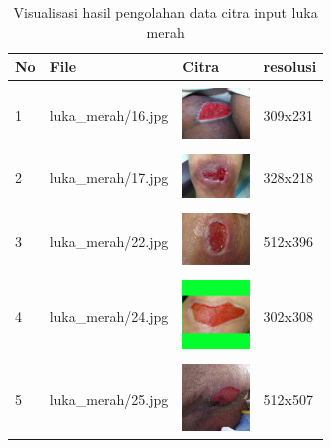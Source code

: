 \begin{table}[H]
	\centering
	\caption{Visualisasi hasil pengolahan data citra input luka merah}
	\label{tabel_input_8}
	\begin{tabular}{|m{0.2in}|m{1.2in}|m{0.7in}|m{0.7in}|}
		\hline
		\textbf{No} & \textbf{File} & \textbf{Citra} & \textbf{resolusi} \\
		\hline
		
		& &  &  \\
		1 & 
		luka\_merah/16.jpg &
		\includegraphics[width=0.7in]{gambar/dataset_citra/luka_merah/bahan/16.jpg}&
		309x231\\
		\hline
		
		& &  &  \\
		2& 
		luka\_merah/17.jpg &
		\includegraphics[width=0.7in]{gambar/dataset_citra/luka_merah/bahan/17.jpg}&
		328x218\\
		\hline
		
		& &  &  \\
		3& 
		luka\_merah/22.jpg &
		\includegraphics[width=0.7in]{gambar/dataset_citra/luka_merah/bahan/22.jpg}&
		512x396\\
		\hline
		
		& &  &  \\
		4& 
		luka\_merah/24.jpg &
		\includegraphics[width=0.7in]{gambar/dataset_citra/luka_merah/bahan/24.jpg}&
		302x308\\
		\hline
		
		& &  &  \\
		5& 
		luka\_merah/25.jpg &
		\includegraphics[width=0.7in]{gambar/dataset_citra/luka_merah/bahan/25.jpg}&
		512x507\\
		\hline
		

\end{tabular}
\end{table}
